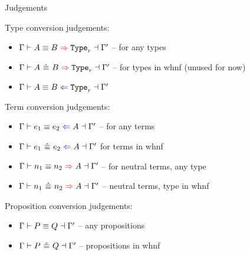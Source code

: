 \begin{frame}{Judgements}

Type conversion judgements:
\begin{itemize}
  \item $\infertypeconv{\Gamma}{A}{B}[r]{\Gamma'}$ -- for any types
  \item $\infertypeconvwhnf{\Gamma}{A}{B}[r]{\Gamma'}$ -- for types in whnf (unused for now)
  \item $\checktypeconv{\Gamma}{A}{B}[r]{\Gamma'}$
\end{itemize}

\vspace{1em}

Term conversion judgements:
\begin{itemize}
  \item $\checktermconv{\Gamma}{e_1}{e_2}{A}{\Gamma'}$ -- for any terms
  \item $\checktermconvwhnf{\Gamma}{e_1}{e_2}{A}{\Gamma'}$ for terms in whnf
  \item $\infertermconv{\Gamma}{n_1}{n_2}{A}{\Gamma'}$ -- for neutral terms, any type
  \item $\infertermconvwhnf{\Gamma}{n_1}{n_2}{A}{\Gamma'}$ -- neutral terms, type in whnf
\end{itemize}

\vspace{1em}

Proposition conversion judgements:
\begin{itemize}
  \item $\Gamma \vdash P \equiv Q \dashv \Gamma'$ -- any propositions
  \item $\Gamma \vdash P\ \hat{\equiv}\ Q \dashv \Gamma'$ -- propositions in whnf
\end{itemize}

\end{frame}